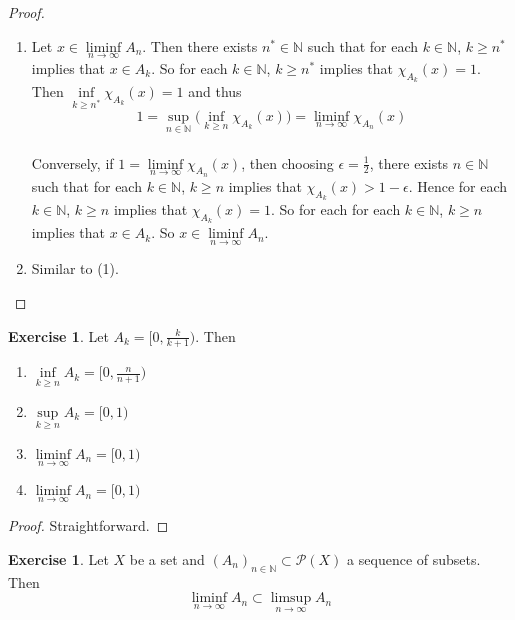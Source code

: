 \documentclass{book}
\theoremstyle{definition}
\newtheorem{ex}[definition]{Exercise}
\newcommand{\ep}{\epsilon}
\newcommand{\N}{\mathbb{N}}
\newcommand{\MP}{\mathcal{P}}
\newcommand{\lex}[1]{\label{ex:#1}}
\DeclareMathOperator*{\0}{\mbf{0}}
\DeclareMathOperator*{\1}{\mbf{1}}
\begin{document}
	\begin{proof}\
		\begin{enumerate}
			\item Let $x \in \liminf\limits_{n \rightarrow \infty}A_n$. Then there exists $n^* \in \N$ such that for each $k \in \N$, $k \geq n^*$ implies that $x \in A_k$. So for each $k \in \N$, $k \geq n^*$ implies that $\chi_{A_k}(x) = 1$. Then $\inf\limits_{k \geq n^*}\chi_{A_k}(x) = 1$ and thus $$1 = \sup\limits_{n \in \N} \bigg(\inf\limits_{k \geq n} \chi_{A_k}(x) \bigg) = \liminf_{n \rightarrow \infty}\chi_{A_n}(x)$$ \vspace{3mm} \\
			Conversely, if $1 = \liminf\limits_{n \rightarrow \infty}\chi_{A_n}(x)$, then choosing $\ep = \frac{1}{2}$, there exists $n \in \N$ such that for each $k \in \N$, $k \geq n$ implies that $\chi_{A_k}(x) > 1-\ep$. Hence for each $k \in \N$, $k \geq n$ implies that $\chi_{A_k}(x) = 1$. So for each for each $k \in \N$, $k \geq n$ implies that $x \in A_k$. So $x \in \liminf\limits_{n \rightarrow \infty} A_n$. 
			\item Similar to (1).
		\end{enumerate}
	\end{proof}
	
	\begin{ex} \lex{00000} 
		Let $A_k = [0, \frac{k}{k+1})$. Then 
		\begin{enumerate}
			\item $\inf\limits_{k \geq n}A_k = [0, \frac{n}{n+1})$ \\
			\item $\sup\limits_{k \geq n}A_k = [0,1)$ \\
			\item $\liminf\limits_{n \rightarrow \infty}A_n = [0,1)$ \\
			\item $\liminf\limits_{n \rightarrow \infty}A_n = [0,1)$
		\end{enumerate}
	\end{ex}
	
	\begin{proof}
		Straightforward.
	\end{proof}
	
	\begin{ex} \lex{00000} 
		Let $X$ be a set and $(A_n)_{n \in \N} \subset \MP(X)$ a sequence of subsets. Then $$\liminf_{n \rightarrow \infty} A_n \subset \limsup_{n \rightarrow \infty} A_n$$
	\end{ex}
	
\end{document}
